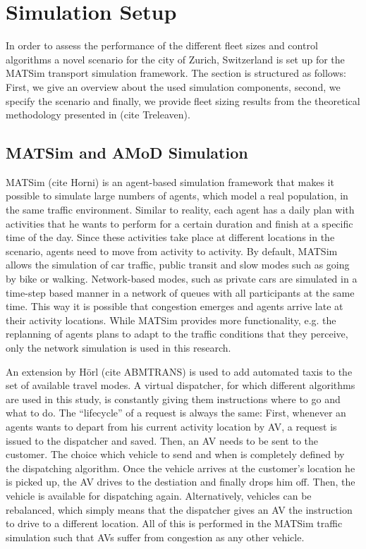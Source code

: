 \section{Simulation Setup}

In order to assess the performance of the different fleet sizes and control
algorithms a novel scenario for the city of Zurich, Switzerland is set up
for the MATSim transport simulation framework. The section is structured as follows:
First, we give an overview about the used simulation components, second, we specify
the scenario and finally, we provide fleet sizing results from the theoretical
methodology presented in (cite Treleaven).

\subsection{MATSim and AMoD Simulation}

MATSim (cite Horni) is an agent-based simulation framework that makes it possible
to simulate large numbers of agents, which model a real population, in the same
traffic environment. Similar to reality, each agent has a daily plan with activities
that he wants to perform for a certain duration and finish at a specific time of
the day. Since these activities take place at different locations in the scenario,
agents need to move from activity to activity. By default, MATSim allows the
simulation of car traffic, public transit and slow modes such as going by bike
or walking. Network-based modes, such as private cars are simulated in a time-step
based manner in a network of queues with all participants at the same time. This
way it is possible that congestion emerges and agents arrive late at their
activity locations. While MATSim provides more functionality, e.g. the replanning
of agents plans to adapt to the traffic conditions that they perceive, only the
network simulation is used in this research.

An extension by Hörl (cite ABMTRANS) is used to add automated taxis to the set
of available travel modes. A virtual dispatcher, for which
different algorithms are used in this study, is constantly giving them instructions
where to go and what to do. The ``lifecycle'' of a request is always the same:
First, whenever an agents wants to depart from his current activity location by
AV, a request is issued to the dispatcher and saved. Then, an AV needs to be sent
to the customer. The choice which vehicle to send and when is completely defined
by the dispatching algorithm. Once the vehicle arrives at the customer's location
he is picked up, the AV drives to the destiation and finally drops him off. Then,
the vehicle is available for dispatching again. Alternatively, vehicles can be
rebalanced, which simply means that the dispatcher gives an AV the instruction
to drive to a different location. All of this is performed in the MATSim traffic
simulation such that AVs suffer from congestion as any other vehicle.

